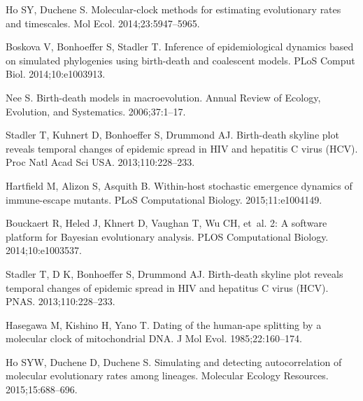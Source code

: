 \documentclass{bmcart}
\begin{document}
\begin{backmatter}
\begin{thebibliography}{10}
Ho SY, Duchene S.
\newblock Molecular-clock methods for estimating evolutionary rates and
  timescales.
\newblock Mol Ecol. 2014;\hspace{0pt}23:5947--5965.

Boskova V, Bonhoeffer S, Stadler T.
\newblock Inference of epidemiological dynamics based on simulated phylogenies
  using birth-death and coalescent models.
\newblock PLoS Comput Biol. 2014;\hspace{0pt}10:e1003913.

Nee S.
\newblock Birth-death models in macroevolution.
\newblock Annual Review of Ecology, Evolution, and Systematics.
  2006;\hspace{0pt}37:1--17.

Stadler T, Kuhnert D, Bonhoeffer S, Drummond AJ.
\newblock Birth-death skyline plot reveals temporal changes of epidemic spread
  in {HIV} and hepatitis {C} virus {(HCV)}.
\newblock Proc Natl Acad Sci USA. 2013;\hspace{0pt}110:228--233.

Hartfield M, Alizon S, Asquith B.
\newblock Within-host stochastic emergence dynamics of immune-escape mutants.
\newblock PLoS Computational Biology. 2015;\hspace{0pt}11:e1004149.

Bouckaert R, Heled J, {Khnert} D, Vaughan T, Wu CH, et~al.
 2: A software platform for {Bayesian} evolutionary analysis.
\newblock PLOS Computational Biology. 2014;\hspace{0pt}10:e1003537.

Stadler T, D K, Bonhoeffer S, Drummond AJ.
\newblock Birth-death skyline plot reveals temporal changes of epidemic spread
  in {HIV} and hepatitus {C} virus {(HCV)}.
\newblock PNAS. 2013;\hspace{0pt}110:228--233.

Hasegawa M, Kishino H, Yano T.
\newblock Dating of the human-ape splitting by a molecular clock of
  mitochondrial {DNA}.
\newblock J Mol Evol. 1985;\hspace{0pt}22:160--174.

Ho SYW, Duchene D, Duchene S.
\newblock Simulating and detecting autocorrelation of molecular evolutionary
  rates among lineages.
\newblock Molecular Ecology Resources. 2015;\hspace{0pt}15:688--696.


\end{thebibliography}
\end{backmatter}
\end{document}
